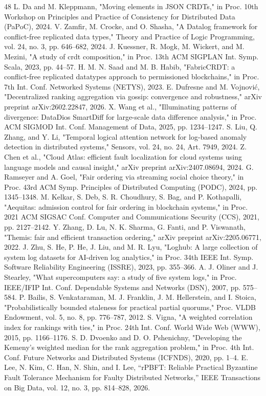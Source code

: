 \documentclass[journal]{IEEEtran}
\begin{document}
\begin{thebibliography}{48}
 L. Da and M. Kleppmann, "Moving elements in JSON CRDTs," in Proc. 10th Workshop on Principles and Practice of Consistency for Distributed Data (PaPoC), 2024.
 V. Zamfir, M. Crocke, and O. Shasha, "A Datalog framework for conflict-free replicated data types," Theory and Practice of Logic Programming, vol. 24, no. 3, pp. 646–682, 2024.
 J. Kuessner, R. Mogk, M. Wickert, and M. Mezini, "A study of crdt composition," in Proc. 13th ACM SIGPLAN Int. Symp. Scala, 2023, pp. 44–57.
 H. M. N. Saad and M. B. Habib, "FabricCRDT: a conflict-free replicated datatypes approach to permissioned blockchains," in Proc. 7th Int. Conf. Networked Systems (NETYS), 2023.
 E. Dufresne and M. Vojnovi\'c, "Decentralized ranking aggregation via gossip: convergence and robustness," arXiv preprint arXiv:2602.22847, 2026.
 X. Wang et al., "Illuminating patterns of divergence: DataDios SmartDiff for large-scale data difference analysis," in Proc. ACM SIGMOD Int. Conf. Management of Data, 2025, pp. 1234–1247.
 S. Liu, Q. Zhang, and Y. Li, "Temporal logical attention network for log-based anomaly detection in distributed systems," Sensors, vol. 24, no. 24, Art. 7949, 2024.
 Z. Chen et al., "Cloud Atlas: efficient fault localization for cloud systems using language models and causal insight," arXiv preprint arXiv:2407.08694, 2024.
 G. Ramseyer and A. Goel, "Fair ordering via streaming social choice theory," in Proc. 43rd ACM Symp. Principles of Distributed Computing (PODC), 2024, pp. 1345–1348.
 M. Kelkar, S. Deb, S. R. Choudhury, S. Bag, and P. Kothapalli, "Aequitas: admission control for fair ordering in blockchain systems," in Proc. 2021 ACM SIGSAC Conf. Computer and Communications Security (CCS), 2021, pp. 2127–2142.
 Y. Zhang, D. Lu, N. K. Sharma, G. Fanti, and P. Viswanath, "Themis: fair and efficient transaction ordering," arXiv preprint arXiv:2205.06771, 2022.
 J. Zhu, S. He, P. He, J. Liu, and M. R. Lyu, "Loghub: A large collection of system log datasets for AI-driven log analytics," in Proc. 34th IEEE Int. Symp. Software Reliability Engineering (ISSRE), 2023, pp. 355–366.
 A. J. Oliner and J. Stearley, "What supercomputers say: a study of five system logs," in Proc. IEEE/IFIP Int. Conf. Dependable Systems and Networks (DSN), 2007, pp. 575–584.
 P. Bailis, S. Venkataraman, M. J. Franklin, J. M. Hellerstein, and I. Stoica, "Probabilistically bounded staleness for practical partial quorums," Proc. VLDB Endowment, vol. 5, no. 8, pp. 776–787, 2012.
 S. Vigna, "A weighted correlation index for rankings with ties," in Proc. 24th Int. Conf. World Wide Web (WWW), 2015, pp. 1166–1176.
 S. D. Dvoenko and D. O. Pshenichny, "Developing the Kemeny's weighted median for the rank aggregation problem," in Proc. 4th Int. Conf. Future Networks and Distributed Systems (ICFNDS), 2020, pp. 1–4.
 E. Lee, N. Kim, C. Han, N. Shin, and I. Lee, “rPBFT: Reliable Practical Byzantine Fault Tolerance Mechanism for Faulty Distributed Networks,” IEEE Transactions on Big Data, vol. 12, no. 3, pp. 814–828, 2026.
\end{thebibliography}
\end{document}
